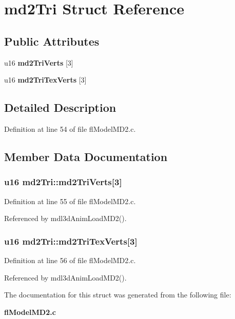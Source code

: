 \section{md2Tri Struct Reference}
\label{structmd2Tri}
\subsection*{Public Attributes}
\begin{CompactItemize}
\item 
u16 {\bf md2Tri\-Verts} [3]
\item 
u16 {\bf md2Tri\-Tex\-Verts} [3]
\end{CompactItemize}


\subsection{Detailed Description}




Definition at line 54 of file fl\-Model\-MD2.c.

\subsection{Member Data Documentation}
\subsubsection{\setlength{\rightskip}{0pt plus 5cm}u16 {\bf md2Tri::md2Tri\-Verts}[3]}\label{structmd2Tri_f2704861c273c266c4ab85c82a9f1ddf}




Definition at line 55 of file fl\-Model\-MD2.c.

Referenced by mdl3d\-Anim\-Load\-MD2().
\subsubsection{\setlength{\rightskip}{0pt plus 5cm}u16 {\bf md2Tri::md2Tri\-Tex\-Verts}[3]}\label{structmd2Tri_a933a119f0c335ee43cb645c6f23a585}




Definition at line 56 of file fl\-Model\-MD2.c.

Referenced by mdl3d\-Anim\-Load\-MD2().

The documentation for this struct was generated from the following file:\begin{CompactItemize}
\item 
{\bf fl\-Model\-MD2.c}\end{CompactItemize}
